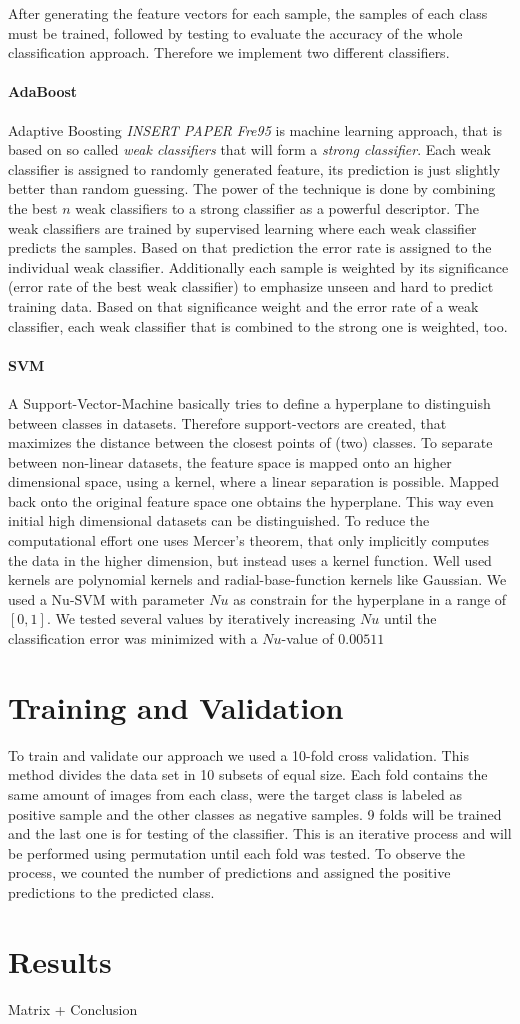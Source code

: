\documentclass[a4paper,10pt]{article}
\begin{document}
After generating the feature vectors for each sample, the samples of each class must be trained, followed by testing to evaluate the accuracy of the whole classification approach. 
Therefore we implement two different classifiers. 

\paragraph{AdaBoost}
Adaptive Boosting \emph{INSERT PAPER Fre95} is machine learning approach, that is based on so called \textit{weak classifiers} that will form a \textit{strong classifier}. Each weak classifier is assigned to randomly generated feature, its prediction is just slightly better than random guessing. The power of the technique is done by combining the best $n$ weak classifiers to a strong classifier as a powerful descriptor. The weak classifiers are trained by supervised learning where each weak classifier predicts the samples. Based on that prediction the error rate is assigned to the individual weak classifier. Additionally each sample is weighted by its significance (error rate of the best weak classifier) to emphasize unseen and hard to predict training data. Based on that significance weight and the error rate of a weak classifier, each weak classifier that is combined to the strong one is weighted, too.
\paragraph{SVM}
A Support-Vector-Machine basically tries to define a hyperplane to distinguish between classes in datasets. Therefore support-vectors are created, that maximizes the distance between the closest points of (two) classes. To separate between non-linear datasets, the feature space is mapped onto an higher dimensional space, using a kernel, where a linear separation is possible. Mapped back onto the original feature space one obtains the hyperplane. This way even initial high dimensional datasets can be distinguished. To reduce the computational effort one uses Mercer's theorem, that only implicitly computes the data in the higher dimension, but instead uses a kernel function. Well used kernels are polynomial kernels and radial-base-function kernels like Gaussian. We used a Nu-SVM with parameter $Nu$ as constrain for the hyperplane in a range of $[0,1]$. We tested several values by iteratively increasing $Nu$ until the classification error was minimized with a $Nu$-value of $0.00511$ 

\section{Training and Validation}
To train and validate our approach we used a 10-fold cross validation. 
This method divides the data set in 10 subsets of equal size. Each fold contains the same amount of images from each class, were the target class is labeled as positive sample and the other classes as negative samples. 9 folds will be trained and the last one is for testing of the classifier.
This is an iterative process and will be performed using permutation until each fold was tested.
To observe the process, we counted the number of predictions and assigned the positive predictions to the predicted class.
\section{Results}
Matrix + Conclusion 
\end{document}
